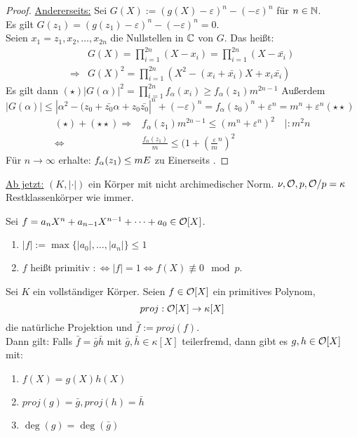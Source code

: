 \begin{proof}
\underline{Andererseits:} Sei $G(X):=(g(X)-\varepsilon)^n-(-\varepsilon)^n$ für $n \in \mathbb{N}$.\\
Es gilt $G(z_1)=(g(z_1)-\varepsilon)^n-(-\varepsilon)^n=0.$\\
Seien $x_1=z_1, x_2, \dots, x_{2n}$ die Nullstellen in $\mathbb{C}$ von $G$. Das heißt:
\begin{align*}
&G(X)=\prod_{i=1}^{2n}(X-x_i)=\prod_{i=1}^{2n}(X-\bar{x_i})\\
\Rightarrow & G(X)^2=\prod_{i=1}^{2n}(X^2-(x_i+\bar{x_i})X+x_i\bar{x_i})
\end{align*}
Es gilt dann
$(\star) |G(\alpha)|^2=\prod_{i=1}^{2n} f_\alpha (x_i)\geq f_\alpha(z_1)m^{2n-1}$
Außerdem $|G(\alpha)| \leq |\alpha^2-(z_0+\bar{z_0}\alpha+z_0\bar{z_0}|^n+(-\varepsilon)^n=f_\alpha(z_0)^n+\varepsilon^n=m^n+\varepsilon^n (\star \star)$\\
\begin{align*}
(\star) + (\star \star) \Rightarrow & f_\alpha(z_1)m^{2n-1}\leq (m^n+\varepsilon^n)^2 \quad |:m^2n\\
\iff & \frac{f_\alpha(z_1)}{m} \leq (1+(\frac{\varepsilon}{m}^n)^2
\end{align*}
Für $n \to \infty$ erhalte: $f_\alpha(z_1) \leq m \Lightning$ zu \glqq Einerseits \grqq.
\end{proof}

\underline{Ab jetzt:} $(K, |\cdot|)$ ein Körper mit nicht archimedischer Norm. $\nu, \mathcal{O}, p, \mathcal{O}/p=\kappa$ Restklassenkörper wie immer.

\begin{defi}
Sei $f=a_nX^n+a_{n-1}X^{n-1}+ \dots + a_0 \in \mathcal{O}[X]$.
\begin{enumerate}
\item $|f|:=\max\{|a_0|, \dots, |a_n|\} \leq 1$
\item $f$ heißt primitiv $: \iff |f|=1 \iff f(X)\not \equiv 0 \mod p$.
\end{enumerate}
\end{defi}

\begin{Satz}
Sei $K$ ein vollständiger Körper. Seien $f \in \mathcal{O}[X]$ ein primitives Polynom,
\[proj: \mathcal{O}[X] \to \kappa[X]\]
die natürliche Projektion und $\bar{f}:=proj(f)$.\\
Dann gilt: Falls $\bar{f}=\bar{g}\bar{h}$ mit $\bar{g}, \bar{h} \in \kappa[X]$ teilerfremd, dann gibt es $g,h \in \mathcal{O}[X]$ mit:
\begin{enumerate}[(1)]
\item $f(X)=g(X)h(X)$
\item $proj(g)=\bar{g}, proj(h)=\bar{h}$
\item $\deg(g)=\deg(\bar{g})$
\end{enumerate}
\end{Satz}

